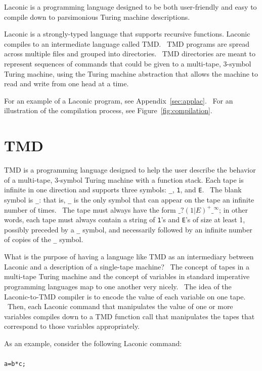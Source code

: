 \documentclass[11pt]{article}
\begin{document}
Laconic is a programming language designed to be both user-friendly and easy to compile down to parsimonious Turing machine descriptions.

Laconic is a strongly-typed language that supports recursive functions. Laconic compiles to an intermediate language called TMD. \ TMD programs are spread across multiple files and grouped into directories. \ TMD directories are meant to represent sequences of commands that could be given to a multi-tape, $3$-symbol Turing machine, using the Turing machine abstraction that allows the machine to read and write from one head at a time.

For an example of a Laconic program, see Appendix~\ref{sec:applac}. \ For an illustration of the compilation process, see Figure~\ref{fig:compilation}.

\section{TMD}

TMD is a programming language designed to help the user describe the behavior of a multi-tape, $3$-symbol Turing machine with a function stack. Each tape is infinite in one direction and supports three symbols: \texttt{\_}, \texttt{1}, and \texttt{E}. \ The blank symbol is \texttt{\_}: that is, \texttt{\_} is the only symbol that can appear on the tape an infinite number of times. \ The tape must always have the form $\texttt{\_}?(1|E)^+\texttt{\_}^{\infty}$; in other words, each tape must always contain a string of \texttt{1}'s and \texttt{E}'s of size at least 1, possibly preceded by a \texttt{\_} symbol, and necessarily followed by an infinite number of copies of the \texttt{\_} symbol.

What is the purpose of having a language like TMD as an intermediary between Laconic and a description of a single-tape machine? \ The concept of tapes in a multi-tape Turing machine and the concept of variables in standard imperative programming languages map to one another very nicely. \ The idea of the Laconic-to-TMD compiler is to encode the value of each variable on one tape. \ Then, each Laconic command that manipulates the value of one or more variables compiles down to a TMD function call that manipulates the tapes that correspond to those variables appropriately.

As an example, consider the following Laconic command: \\ \\
\texttt{a=b*c;} \\
\end{document}
